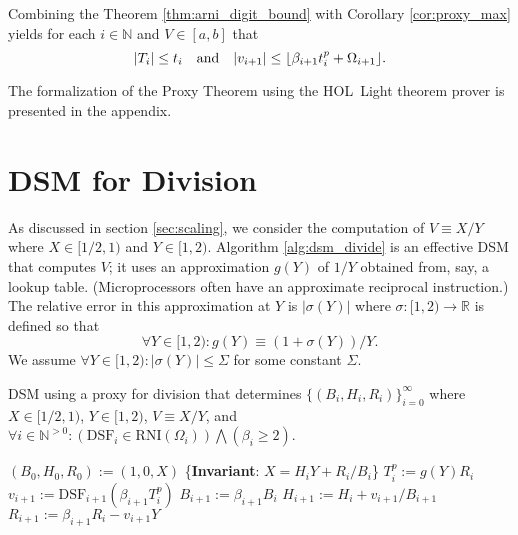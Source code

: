 \documentclass[10pt]{article}
\DeclarePairedDelimiter\floor{\lfloor}{\rfloor}
\theoremstyle{definition}
\theoremstyle{remark}
\numberwithin{equation}{section}
\newcommand{\assign}{:=}
\newcommand{\dsf}{\text{DSF}}
\newcommand{\rni}[1]{\text{RNI}({#1})}
\newcommand{\nats}{\mathbb{N}}
\newcommand{\pnats}{\mathbb{N}^{>0}}
\newcommand{\reals}{\mathbb{R}}
\newcommand{\abs}[1]{\lvert #1 \rvert}
\begin{document}
Combining the Theorem \ref{thm:arni_digit_bound} with Corollary \ref{cor:proxy_max} yields for each $i \in \nats$ and $V \in [a,b]$ that
\[
  \abs{T_i} \le t_i\quad\text{and}\quad 
  \abs{v_{i+1}} \le \floor{\beta_{i+1} t^p_i + \Omega_{i+1}} .
\]

The formalization of the Proxy Theorem using the {HOL~Light} theorem prover is presented in the appendix.

\section{DSM for Division\label{sec:dsm_division}}

As discussed in section \ref{sec:scaling}, we consider the computation of $V \equiv X/Y$ where $X\in[1/2,1)$ and $Y\in[1,2)$.
Algorithm \ref{alg:dsm_divide} is an effective DSM that computes $V$; it uses an approximation $g(Y)$ of $1/Y$ obtained from, say, a lookup table. (Microprocessors often have an approximate reciprocal instruction.)
The relative error in this approximation at $Y$ is $\abs{\sigma(Y)}$ where $\sigma : [1,2) \rightarrow \reals$ is defined so that
\[
\forall Y \in [1,2): g(Y) \equiv (1+\sigma(Y))/Y .
\]
We assume $\forall Y \in [1,2): \abs{\sigma(Y)} \le \Sigma$ for some constant $\Sigma$.

\begin{algorithm}[t]
	\caption{DSM using a proxy for division that determines $\{(B_i, H_i, R_i)\}_{i=0}^\infty$ where $X \in [1/2,1)$, $Y \in [1,2)$, $V \equiv X/Y$, and $\forall i \in \pnats: (\dsf_i \in \rni{\Omega_i}) \bigwedge (\beta_i \ge 2)$.\label{alg:dsm_divide}}
	\begin{algorithmic}[0] %
		\State $(B_0, H_0, R_0) \assign (1, 0, X)$
		\For{$i \assign 0,1,2,\ldots$}
        \State \{\textbf{Invariant}: $X = H_i Y + R_i/B_i$\}
		\State $T^p_i \assign g(Y) R_i$
		\State $v_{i+1} \assign \dsf_{i+1}(\beta_{i+1} T^p_i)$
		\State $B_{i+1} \assign \beta_{i+1} B_{i}$
		\State $H_{i+1} \assign H_{i} + v_{i+1}/B_{i+1}$
		\State $R_{i+1} \assign \beta_{i+1} R_{i} - v_{i+1} Y$
		\EndFor
		\EndProcedure
	\end{algorithmic}
\end{algorithm} 
\end{document}
